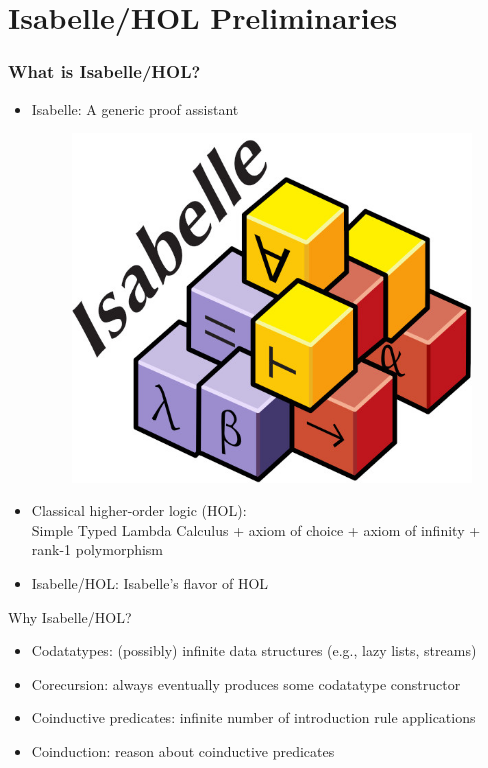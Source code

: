 \documentclass[fleqn,aspectratio=169,10pt]{beamer}
\begin{document}
\section{Isabelle/HOL Preliminaries}

\begin{frame}[fragile]
  \frametitle{What is Isabelle/HOL?}
  \pause
  \begin{itemize}
    \item Isabelle: A generic proof assistant
          \begin{overlayarea}{\textwidth}{.3\textheight}
            \centering
            \begin{figure}
              \centering
              \includegraphics[scale=0.15]{isabelle}
            \end{figure}
          \end{overlayarea}
    \item Classical higher-order logic (HOL):\\ Simple Typed Lambda Calculus + axiom of choice + axiom of infinity + rank-1 polymorphism
          \pause
    \item Isabelle/HOL: Isabelle's flavor of HOL
  \end{itemize}
  \pause
    \begin{block}{Why Isabelle/HOL?}
      \begin{itemize}
        \item Codatatypes: (possibly) infinite data structures (e.g., lazy lists, streams)
        \item Corecursion: always eventually produces some codatatype constructor
        \item Coinductive predicates: infinite number of introduction rule applications
        \item Coinduction: reason about coinductive predicates
      \end{itemize}
  \end{block}

\end{frame}
\end{document}
